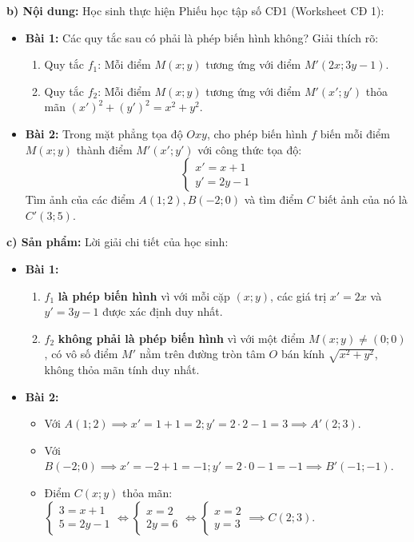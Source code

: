 \documentclass[12pt, a4paper]{article}
\begin{document}
\textbf{b) Nội dung:} Học sinh thực hiện Phiếu học tập số CĐ1 (Worksheet CĐ 1):
\begin{itemize}[leftmargin=0.6cm]
    \item \textbf{Bài 1:} Các quy tắc sau có phải là phép biến hình không? Giải thích rõ:
    \begin{enumerate}[leftmargin=0.5cm]
        \item Quy tắc $f_1$: Mỗi điểm $M(x; y)$ tương ứng với điểm $M'(2x; 3y - 1)$.
        \item Quy tắc $f_2$: Mỗi điểm $M(x; y)$ tương ứng với điểm $M'(x'; y')$ thỏa mãn $(x')^2 + (y')^2 = x^2 + y^2$.
    \end{enumerate}
    \item \textbf{Bài 2:} Trong mặt phẳng tọa độ $Oxy$, cho phép biến hình $f$ biến mỗi điểm $M(x; y)$ thành điểm $M'(x'; y')$ với công thức tọa độ:
    $$\begin{cases} x' = x + 1 \\ y' = 2y - 1 \end{cases}$$
    Tìm ảnh của các điểm $A(1; 2), B(-2; 0)$ và tìm điểm $C$ biết ảnh của nó là $C'(3; 5)$.
\end{itemize}

\textbf{c) Sản phẩm:} Lời giải chi tiết của học sinh:
\begin{itemize}[leftmargin=0.6cm]
    \item \textbf{Bài 1:}
    \begin{enumerate}[leftmargin=0.5cm]
        \item $f_1$ \textbf{là phép biến hình} vì với mỗi cặp $(x; y)$, các giá trị $x' = 2x$ và $y' = 3y - 1$ được xác định duy nhất.
        \item $f_2$ \textbf{không phải là phép biến hình} vì với một điểm $M(x; y) \neq (0; 0)$, có vô số điểm $M'$ nằm trên đường tròn tâm $O$ bán kính $\sqrt{x^2 + y^2}$, không thỏa mãn tính duy nhất.
    \end{enumerate}
    \item \textbf{Bài 2:}
    \begin{itemize}[leftmargin=0.5cm]
        \item Với $A(1; 2) \implies x' = 1 + 1 = 2; y' = 2 \cdot 2 - 1 = 3 \implies A'(2; 3)$.
        \item Với $B(-2; 0) \implies x' = -2 + 1 = -1; y' = 2 \cdot 0 - 1 = -1 \implies B'(-1; -1)$.
        \item Điểm $C(x; y)$ thỏa mãn: $\begin{cases} 3 = x + 1 \\ 5 = 2y - 1 \end{cases} \iff \begin{cases} x = 2 \\ 2y = 6 \end{cases} \iff \begin{cases} x = 2 \\ y = 3 \end{cases} \implies C(2; 3)$.
    \end{itemize}
\end{itemize}
\end{document}
